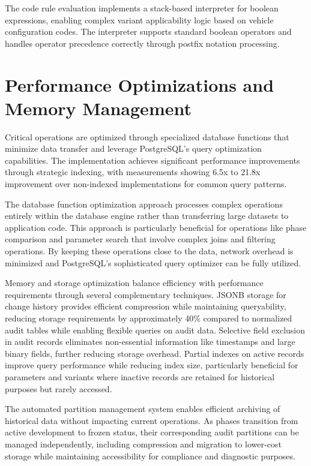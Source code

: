 The code rule evaluation implements a stack-based interpreter for boolean expressions, enabling complex variant applicability logic based on vehicle configuration codes. The interpreter supports standard boolean operators and handles operator precedence correctly through postfix notation processing.

\section{Performance Optimizations and Memory Management}
\label{sec:performance-optimizations}

Critical operations are optimized through specialized database functions that minimize data transfer and leverage PostgreSQL's query optimization capabilities. The implementation achieves significant performance improvements through strategic indexing, with measurements showing 6.5x to 21.8x improvement over non-indexed implementations for common query patterns.

The database function optimization approach processes complex operations entirely within the database engine rather than transferring large datasets to application code. This approach is particularly beneficial for operations like phase comparison and parameter search that involve complex joins and filtering operations. By keeping these operations close to the data, network overhead is minimized and PostgreSQL's sophisticated query optimizer can be fully utilized.

Memory and storage optimization balance efficiency with performance requirements through several complementary techniques. JSONB storage for change history provides efficient compression while maintaining queryability, reducing storage requirements by approximately 40\% compared to normalized audit tables while enabling flexible queries on audit data. Selective field exclusion in audit records eliminates non-essential information like timestamps and large binary fields, further reducing storage overhead. Partial indexes on active records improve query performance while reducing index size, particularly beneficial for parameters and variants where inactive records are retained for historical purposes but rarely accessed.

The automated partition management system enables efficient archiving of historical data without impacting current operations. As phases transition from active development to frozen status, their corresponding audit partitions can be managed independently, including compression and migration to lower-cost storage while maintaining accessibility for compliance and diagnostic purposes.

